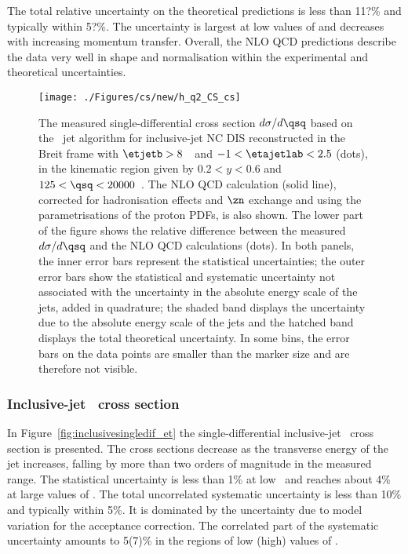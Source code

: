 The total relative uncertainty on the theoretical predictions is less than 11?\% and typically within 5?\%. The uncertainty is largest at low values of \qsq and decreases with increasing momentum transfer. Overall, the NLO QCD predictions describe the data very well in shape and normalisation within the experimental and theoretical uncertainties.
\begin{figure}[p]
	\centering
		\texttt{[image: ./Figures/cs/new/h\_q2\_CS\_cs]}
	\caption{The measured single-differential cross section $d\sigma/d\qsq$ based on the \kt~jet algorithm for inclusive-jet NC DIS reconstructed in the Breit frame with $\etjetb > 8$~\GeV~and $-1<\etajetlab<2.5$ (dots), in the kinematic region given by $0.2<y<0.6$ and $125 < \qsq < 20000$~\GeV. The NLO QCD calculation (solid line), corrected for hadronisation effects and $\zn$ exchange and using the  parametrisations of the proton PDFs, is also shown. The lower part of the figure shows the relative difference between the measured $d\sigma/d\qsq$ and the NLO QCD calculations (dots). In both panels, the inner error bars represent the statistical uncertainties; the outer error bars show the statistical and systematic uncertainty not associated with the uncertainty in the absolute energy scale of the jets, added in quadrature; the shaded band displays the uncertainty due to the absolute energy scale of the jets and the hatched band displays the total theoretical uncertainty. In some bins, the error bars on the data points are smaller than the marker size and are therefore not visible.} 
	\label{fig:inclusivesingledif_q2}
\end{figure}

\subsubsection*{Inclusive-jet \dsdetjetb~cross section}
In Figure~\ref{fig:inclusivesingledif_et} the single-differential inclusive-jet \dsdetjetb~cross section is presented. The cross sections decrease as the transverse energy of the jet increases, falling by more than two orders of magnitude in the measured range. The statistical uncertainty is less than 1\% at low \etjetb~and reaches about 4\% at large values of \etjetb. The total uncorrelated systematic uncertainty is less than 10\% and typically within 5\%. It is dominated by the uncertainty due to model variation for the acceptance correction. The correlated part of the systematic uncertainty amounts to 5(7)\%  in the regions of low (high) values of \etjetb.

